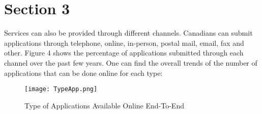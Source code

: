 \section{Section 3}

Services can also be provided through different channels. Canadians can 
submit applications through telephone, online, in-person, postal mail, 
email, fax and other. Figure 4 shows the percentage of applications 
submitted through each channel over the past few years.
One can find the overall trends of the number of applications that can be done online for each type:

\begin{figure}
    \centering
    \texttt{[image: TypeApp.png]}
    \caption{\label{fig:TypeApp}Type of Applications Available Online End-To-End}
    \end{figure}
